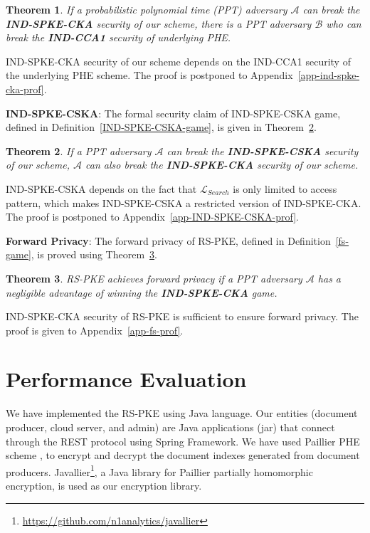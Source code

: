 \documentclass[sigconf,pdftex]{acmart}
\newtheorem{theorem}{Theorem}[]
\begin{document}
\begin{theorem}\label{ind-spke-cka-prof}
If a probabilistic polynomial time (PPT) adversary $\mathcal{A}$ can break the \textbf{IND-SPKE-CKA} security of our scheme, there is a PPT adversary $\mathcal{B}$ who can break the \textbf{IND-CCA1} security of underlying PHE.
\end{theorem}

 
IND-SPKE-CKA security of our scheme depends on the IND-CCA1 security of the underlying PHE scheme. The proof is postponed to Appendix~\ref{app-ind-spke-cka-prof}.


\textbf{IND-SPKE-CSKA}: The formal security claim of IND-SPKE-CSKA game, defined in Definition~\ref{IND-SPKE-CSKA-game}, is given in Theorem~\ref{IND-SPKE-CSKA-prof}.




\begin{theorem}\label{IND-SPKE-CSKA-prof}
If a PPT adversary $\mathcal{A}$ can break the \textbf{IND-SPKE-CSKA} security of our scheme, $\mathcal{A}$ can also break the \textbf{IND-SPKE-CKA} security of our scheme.
\end{theorem}

IND-SPKE-CSKA depends on the fact that $\mathcal{L}_{Search}$ is only limited to access pattern, which makes IND-SPKE-CSKA a restricted version of IND-SPKE-CKA. The proof is postponed to Appendix~\ref{app-IND-SPKE-CSKA-prof}.



\textbf{Forward Privacy}: The forward privacy of RS-PKE, defined in Definition~\ref{fs-game}, is proved using Theorem~\ref{fs-prof}.

\begin{theorem}\label{fs-prof}
RS-PKE achieves forward privacy if a PPT adversary $\mathcal{A}$ has a negligible advantage of winning the \textbf{IND-SPKE-CKA} game.
\end{theorem}


IND-SPKE-CKA security of RS-PKE is sufficient to ensure forward privacy. The proof is given to Appendix~\ref{app-fs-prof}.







\section{Performance Evaluation}\label{evaluation}

We have implemented the RS-PKE using Java language. Our entities (document producer, cloud server, and admin) are Java applications (jar) that connect through the REST protocol using Spring Framework. We have used Paillier PHE scheme \cite{Paillier:1999}, to encrypt and decrypt the document indexes generated from document producers. Javallier\footnote{\url{https://github.com/n1analytics/javallier}}, a Java library for Paillier partially homomorphic encryption, is used as our encryption library.
\end{document}

